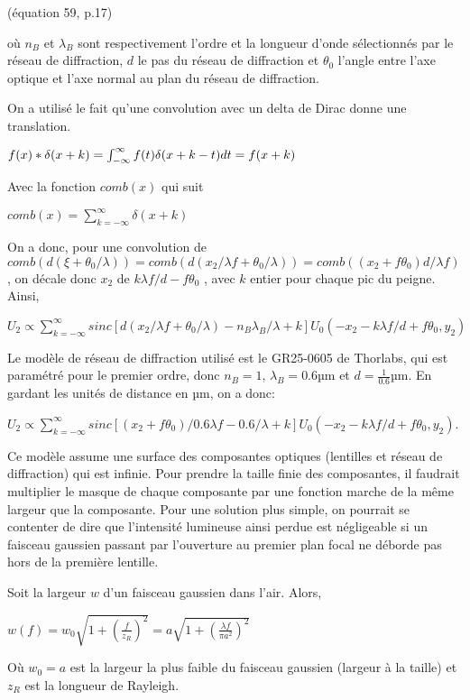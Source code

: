 \documentclass[11pt,letterpaper]{article}
\begin{document}
(équation 59, p.17)

où $n_B$ et $\lambda_B$ sont respectivement l'ordre et la longueur d'onde sélectionnés par le réseau de diffraction, $d$ le pas du réseau de diffraction et $\theta_0$ l'angle entre l'axe optique et l'axe normal au plan du réseau de diffraction.

On a utilisé le fait qu'une convolution avec un delta de Dirac donne une translation.

$
f(x)*\delta(x+k)\\
=\int_{-\infty}^{\infty}f(t)\delta(x+k-t)dt\\
= f(x+k)
$

Avec la fonction $comb(x)$ qui suit

$comb(x)=\sum_{k=-\infty}^{\infty}\delta(x+k)$

On a donc, pour une convolution de $comb(d(\xi+\theta_0/\lambda))=comb(d(x_2/\lambda f+\theta_0/\lambda))=comb((x_2+f\theta_0)d/\lambda f)$, on décale donc $x_2$ de $k\lambda f / d - f\theta_0$ , avec $k$ entier pour chaque pic du peigne. Ainsi,

$U_2 \propto \sum_{k=-\infty}^{\infty}sinc[d(x_2/\lambda f+\theta_0/\lambda)-n_B\lambda_B/\lambda + k] U_0(-x_2-k\lambda f / d + f\theta_0, y_2)$

Le modèle de réseau de diffraction utilisé est le GR25-0605 de Thorlabs, qui est paramétré pour le premier ordre, donc $n_B=1$, $\lambda_B=0.6$µm et $d=\frac{1}{0.6}$µm. En gardant les unités de distance en µm, on a donc:

$U_2 \propto \sum_{k=-\infty}^{\infty}sinc[(x_2+f\theta_0)/0.6 \lambda f-0.6/\lambda + k] U_0(-x_2-k\lambda f / d + f\theta_0, y_2)$.

Ce modèle assume une surface des composantes optiques (lentilles et réseau de diffraction) qui est infinie. Pour prendre la taille finie des composantes, il faudrait multiplier le masque de chaque composante par une fonction marche de la même largeur que la composante. Pour une solution plus simple, on pourrait se contenter de dire que l'intensité lumineuse ainsi perdue est négligeable si un faisceau gaussien passant par l'ouverture au premier plan focal ne déborde pas hors de la première lentille.

Soit la largeur $w$ d'un faisceau gaussien dans l'air. Alors,

$w(f)=w_0 \sqrt{1+(\frac{f}{z_R})^2}= a\sqrt{1+(\frac{\lambda f}{\pi a^2})^2} $

Où $w_0=a$ est la largeur la plus faible du faisceau gaussien (largeur à la taille) et $z_R$ est la longueur de Rayleigh.
\end{document}
